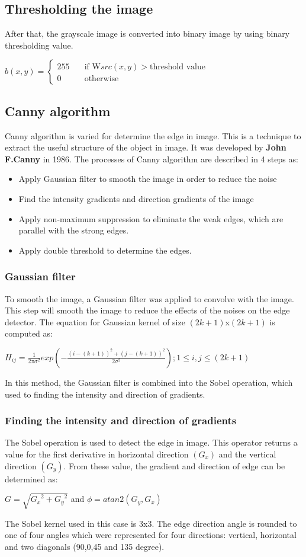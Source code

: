 \documentclass[12pt, a4paper]{article}
\begin{document}
\subsection{Thresholding the image}
After that, the grayscale image is converted into binary image by using binary thresholding value. 
\begin{center}
	$ 
		b(x,y) = \begin{cases}	
					255 & \quad \text{if W} src(x,y) > \text{threshold value}\\
					0   & \quad \text{otherwise}
				 \end{cases}
	$
	
\end{center}
\subsection{Canny algorithm}
Canny algorithm is varied for determine the edge in image. This is a technique to extract the useful structure of the object in image. It was developed by \textbf{John F.Canny} in 1986. The processes of Canny algorithm are described in 4 steps as:
\begin{itemize}
	\item Apply Gaussian filter to smooth the image in order to reduce the noise
	\item Find the intensity gradients and direction gradients of the image
	\item Apply non-maximum suppression to eliminate the weak edges, which are parallel with the strong edges.
	\item Apply double threshold to determine the edges.
\end{itemize}
\subsubsection{Gaussian filter}
To smooth the image, a Gaussian filter was applied to convolve with the image. This step will smooth the image to reduce the effects of the noises on the edge detector. The equation for Gaussian kernel of size $(2k+1)$x$(2k+1)$ is computed as:
\begin{center}
	$H_{ij}=\frac{1}{2\pi\sigma^2}exp(-\frac{(i-(k+1))^2 + (j-(k+1))^2}{2\sigma^2});1\leq i,j \leq (2k+1) $
\end{center}
In this method, the Gaussian filter is combined into the Sobel operation, which used to finding the intensity and direction of gradients.
\subsubsection{Finding the intensity and direction of gradients}
The Sobel operation is used to detect the edge in image. This operator returns a value for the first derivative in horizontal direction $(G_x)$ and the vertical direction $(G_y)$. From these value, the gradient and direction of edge can be determined as:
\begin{center}
$G = \sqrt{{G_x}^2 + {G_y}^2}$ and $\phi = atan2(G_y,G_x)$
\end{center}
The Sobel kernel used in this case is 3x3. The edge direction angle is rounded to one of four angles which were represented for four directions: vertical, horizontal and two diagonals (90,0,45 and 135 degree).
\end{document}
